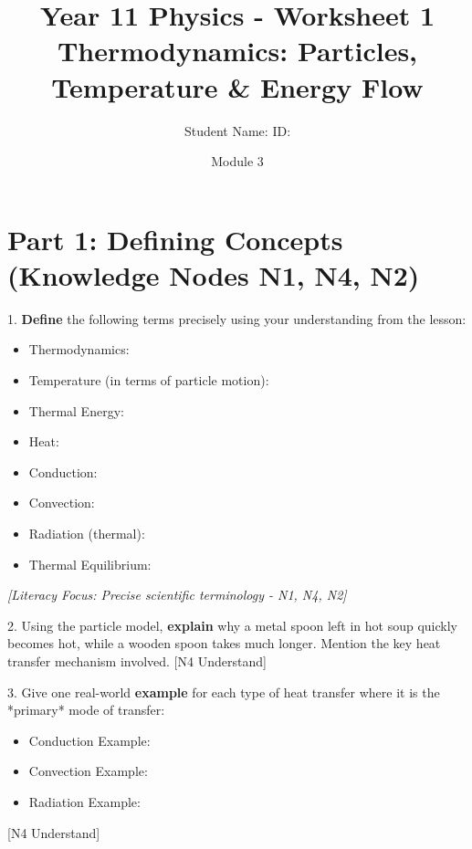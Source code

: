 \documentclass[11pt, a4paper]{article}
\title{Year 11 Physics - Worksheet 1 \\ Thermodynamics: Particles, Temperature & Energy Flow}
\date{Module 3}
\author{Student Name: \underline{\hspace{5cm}} ID: \underline{\hspace{3cm}}} %
\begin{document}
\maketitle

\section*{Part 1: Defining Concepts (Knowledge Nodes N1, N4, N2)}

1.  \textbf{Define} the following terms precisely using your understanding from the lesson:
    \begin{itemize}
        \item Thermodynamics: \vspace{1cm}
        \item Temperature (in terms of particle motion): \vspace{1cm}
        \item Thermal Energy: \vspace{1cm}
        \item Heat: \vspace{1cm}
        \item Conduction: \vspace{1cm}
        \item Convection: \vspace{1cm}
        \item Radiation (thermal): \vspace{1cm}
        \item Thermal Equilibrium: \vspace{1cm}
    \end{itemize}
    \textit{[Literacy Focus: Precise scientific terminology - N1, N4, N2]}

2.  Using the particle model, \textbf{explain} why a metal spoon left in hot soup quickly becomes hot, while a wooden spoon takes much longer. Mention the key heat transfer mechanism involved. [N4 Understand]
    \vspace{2cm}

3.  Give one real-world \textbf{example} for each type of heat transfer where it is the *primary* mode of transfer:
    \begin{itemize}
        \item Conduction Example:
        \item Convection Example:
        \item Radiation Example:
    \end{itemize}
    [N4 Understand]
\end{document}
